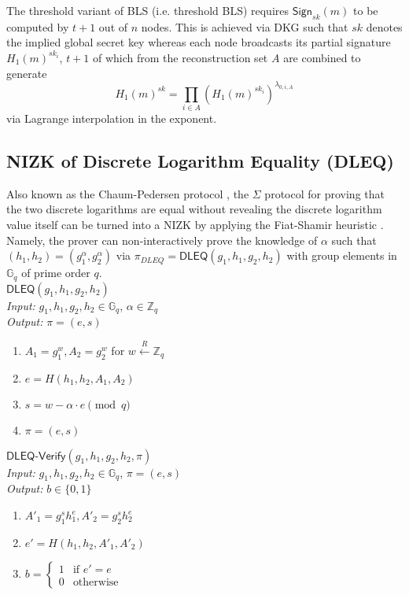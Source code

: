 \documentclass[letterpaper,twocolumn,10pt]{article}
\theoremstyle{definition}
\theoremstyle{remark}
\begin{document}
The threshold variant \cite{boldyreva2003threshold} of BLS (i.e. threshold BLS) requires $\mathsf{Sign}_{sk}(m)$ to be computed by $t + 1$ out of $n$ nodes. This is achieved via DKG such that $sk$ denotes the implied global secret key whereas each node broadcasts its partial signature $H_1(m)^{sk_i}$, $t + 1$ of which from the reconstruction set $A$ are combined to generate
\[
H_1(m)^{sk} = \prod_{i \in A} \left(H_1(m)^{sk_i}\right)^{\lambda_{0, i, A}}
\]
via Lagrange interpolation in the exponent.

\subsection{NIZK of Discrete Logarithm Equality (DLEQ)}
\label{appendix:dleq}
Also known as the Chaum-Pedersen protocol \cite{chaum1992wallet}, the $\Sigma$ protocol for proving that the two discrete logarithms are equal without revealing the discrete logarithm value itself can be turned into a NIZK by applying the Fiat-Shamir heuristic \cite{fiat1986prove}. Namely, the prover can non-interactively prove the knowledge of $\alpha$ such that $(h_1, h_2) = (g_1^\alpha, g_2^\alpha)$ via $\pi_{DLEQ} = \mathsf{DLEQ}(g_1, h_1, g_2, h_2)$ with group elements in $\mathbb{G}_q$ of prime order $q$.\\

\noindent\underline{$\mathsf{DLEQ}(g_1, h_1, g_2, h_2)$}\\
\textit{Input:} $g_1, h_1, g_2, h_2 \in \mathbb{G}_q$, $\alpha \in \mathbb{Z}_q$\\
\textit{Output:} $\pi = (e, s)$
\begin{enumerate}
\item $A_1 = g_1^w, A_2 = g_2^w$ for $w \xleftarrow{R} \mathbb{Z}_q$
\item $e = H(h_1, h_2, A_1, A_2)$
\item $s = w - \alpha \cdot e \pmod q$
\item $\pi = (e, s)$
\end{enumerate}

\noindent\underline{$\mathsf{DLEQ}\text{-}\mathsf{Verify}(g_1, h_1, g_2, h_2, \pi)$}\\
\textit{Input:} $g_1, h_1, g_2, h_2 \in \mathbb{G}_q$, $\pi = (e, s)$\\
\textit{Output:} $b \in \{0, 1\}$
\begin{enumerate}
\item $A'_1 = g_1^s h_1^e, A'_2 = g_2^s h_2^e$
\item $e' = H(h_1, h_2, A'_1, A'_2)$
\item $b = \begin{cases}
1 & \text{if $e' = e$}\\
0 & \text{otherwise}
\end{cases}$
\end{enumerate}
\end{document}
